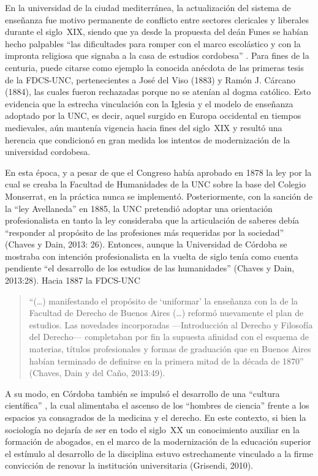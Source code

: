 En la universidad de la ciudad mediterránea, la actualización del sistema de enseñanza fue motivo permanente de conflicto entre sectores clericales y liberales durante el siglo~XIX, siendo que ya desde la propuesta del deán Funes se habían hecho palpables \enquote{las dificultades para romper con el marco escolástico y con la impronta religiosa que signaba a la casa de estudios cordobesa} \parencite[21]{1536-BUCHBINDER2010}. Para fines de la centuria, puede citarse como ejemplo la conocida anécdota de las primeras tesis de la FDCS-UNC, pertenecientes a José del Viso (1883) y Ramón J. Cárcano (1884), las cuales fueron rechazadas porque no se atenían al dogma católico. Esto evidencia que la estrecha vinculación con la Iglesia y el modelo de enseñanza adoptado por la UNC, es decir, aquel surgido en Europa occidental en tiempos medievales, aún mantenía vigencia hacia fines del siglo~XIX y resultó una herencia que condicionó en gran medida los intentos de modernización de la universidad cordobesa.

En esta época, y a pesar de que el Congreso había aprobado en 1878 la ley por la cual se creaba la Facultad de Humanidades de la UNC sobre la base del Colegio Monserrat, en la práctica nunca se implementó. Posteriormente, con la sanción de la \enquote{ley Avellaneda} en 1885, la UNC pretendió adoptar una orientación profesionalista en tanto la ley consideraba que la articulación de saberes debía \enquote{responder al propósito de las profesiones más requeridas por la sociedad} (Chaves y Dain, 2013: 26). Entonces, aunque la Universidad de Córdoba se mostraba con intención profesionalista en la vuelta de siglo tenía como cuenta pendiente \enquote{el desarrollo de los estudios de las humanidades} (Chaves y Dain, 2013:28). Hacia 1887 la FDCS-UNC

\begin{quote}
\enquote{(\dots) manifestando el propósito de \enquote{uniformar} la enseñanza con la de la Facultad de Derecho de Buenos Aires (\dots) reformó nuevamente el plan de estudios. Las novedades incorporadas ---Introducción al Derecho y Filosofía del Derecho--- completaban por fin la supuesta afinidad con el esquema de materias, títulos profesionales y formas de graduación que en Buenos Aires habían terminado de definirse en la primera mitad de la década de 1870} (Chaves, Dain y del Caño, 2013:49).
\end{quote}

A su modo, en Córdoba también se impulsó el desarrollo de una \enquote{cultura científica} \parencite{1506-TERAN2008}, la cual alimentaba el ascenso de los \enquote{hombres de ciencia} frente a los espacios ya consagrados de la medicina y el derecho. En este contexto, si bien la sociología no dejaría de ser en todo el siglo~XX un conocimiento auxiliar en la formación de abogados, en el marco de la modernización de la educación superior el estímulo al desarrollo de la disciplina estuvo estrechamente vinculado a la firme convicción de renovar la institución universitaria (Grisendi, 2010).

